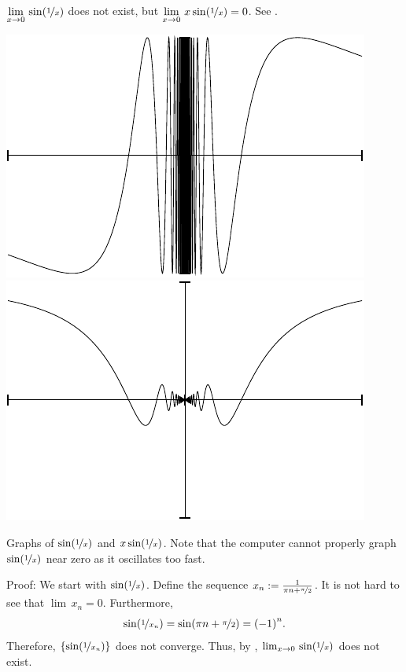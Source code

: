 \begin{example}
$\displaystyle \lim_{x \to 0} \, \sin( \nicefrac{1}{x} )$
does not exist, but 
$\displaystyle \lim_{x \to 0} \, x\sin( \nicefrac{1}{x} ) = 0$.
See .

\begin{myfigureht}
\includegraphics{figures/sin1xfig}
\qquad
\includegraphics{figures/xsin1xfig}
\caption{Graphs of $\sin(\nicefrac{1}{x})$ and $x \sin(\nicefrac{1}{x})$.
Note that the computer cannot properly graph $\sin(\nicefrac{1}{x})$
near zero as it oscillates too fast.\label{figsin1x}}
\end{myfigureht}

Proof:
We start with $\sin(\nicefrac{1}{x})$.  Define the sequence
$x_n := \frac{1}{\pi n + \nicefrac{\pi}{2}}$.  It is not hard to see
that $\lim\, x_n = 0$.  Furthermore,
\begin{equation*}
\sin ( \nicefrac{1}{x_n} )
=
\sin (\pi n + \nicefrac{\pi}{2})
= {(-1)}^n .
\end{equation*}
Therefore, $\{ \sin ( \nicefrac{1}{x_n} ) \}$ does not converge.
Thus, by
, 
$\lim_{x \to 0} \, \sin( \nicefrac{1}{x} )$ does not exist.


\end{example}
